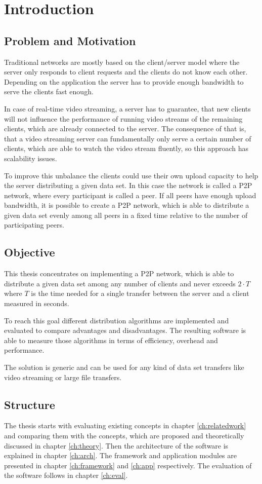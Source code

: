\chapter{Introduction}
\section{Problem and Motivation}
Traditional networks are mostly based on the client/server model where the server only responds to client requests and the clients do not know each other. Depending on the application the server has to provide enough bandwidth to serve the clients fast enough.

In case of real-time video streaming, a server has to guarantee, that new clients will not influence the performance of running video streams of the remaining clients, which are already connected to the server. The consequence of that is, that a video streaming server can fundamentally only serve a certain number of clients, which are able to watch the video stream fluently, so this approach has scalability issues.

To improve this unbalance the clients could use their own upload capacity to help the server distributing a given data set. In this case the network is called a P2P network, where every participant is called a peer. If all peers have enough upload bandwidth, it is possible to create a P2P network, which is able to distribute a given data set evenly among all peers in a fixed time relative to the number of participating peers.

\section{Objective}
This thesis concentrates on implementing a P2P network, which is able to distribute a given data set among any number of clients and never exceeds $2 \cdot T$ where $T$ is the time needed for a single transfer between the server and a client measured in seconds.

To reach this goal different distribution algorithms are implemented and evaluated to compare advantages and disadvantages. The resulting software is able to measure those algorithms in terms of efficiency, overhead and performance.

The solution is generic and can be used for any kind of data set transfers like video streaming or large file transfers.

\section{Structure}
The thesis starts with evaluating existing concepts in chapter \ref{ch:relatedwork} and comparing them with the concepts, which are proposed and theoretically discussed in chapter \ref{ch:theory}. Then the architecture of the software is explained in chapter \ref{ch:arch}. The framework and application modules are presented in chapter \ref{ch:framework} and \ref{ch:app} respectively. The evaluation of the software follows in chapter \ref{ch:eval}.